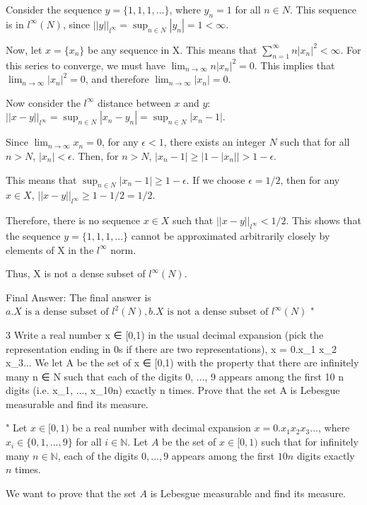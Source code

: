 Consider the sequence $y = \{1, 1, 1, ...\}$, where $y_n = 1$ for all $n \in N$. This sequence is in $l^{\infty}(N)$, since $||y||_{l^{\infty}} = \sup_{n \in N} |y_n| = 1 < \infty$.

Now, let $x = \{x_n\}$ be any sequence in X. This means that $\sum_{n=1}^{\infty} n |x_n|^2 < \infty$. For this series to converge, we must have $\lim_{n \to \infty} n |x_n|^2 = 0$. This implies that $\lim_{n \to \infty} |x_n|^2 = 0$, and therefore $\lim_{n \to \infty} |x_n| = 0$.

Now consider the $l^{\infty}$ distance between $x$ and $y$:
$||x - y||_{l^{\infty}} = \sup_{n \in N} |x_n - y_n| = \sup_{n \in N} |x_n - 1|$.

Since $\lim_{n \to \infty} x_n = 0$, for any $\epsilon < 1$, there exists an integer $N$ such that for all $n > N$, $|x_n| < \epsilon$.
Then, for $n > N$, $|x_n - 1| \ge |1 - |x_n|| > 1 - \epsilon$.

This means that $\sup_{n \in N} |x_n - 1| \ge 1 - \epsilon$.
If we choose $\epsilon = 1/2$, then for any $x \in X$, $||x - y||_{l^{\infty}} \ge 1 - 1/2 = 1/2$.

Therefore, there is no sequence $x \in X$ such that $||x - y||_{l^{\infty}} < 1/2$. This shows that the sequence $y = \{1, 1, 1, ...\}$ cannot be approximated arbitrarily closely by elements of X in the $l^{\infty}$ norm.

Thus, X is not a dense subset of $l^{\infty}(N)$.

Final Answer: The final answer is $\boxed{a. X \text{ is a dense subset of } l^2(N), b. X \text{ is not a dense subset of } l^{\infty}(N)}$
"

3 Write a real number x ∈ [0,1) in the usual decimal expansion (pick the representation ending in 0s if there are two representations), x = 0.x_1 x_2 x_3... We let A be the set of x ∈ [0,1) with the property that there are infinitely many n ∈ N such that each of the digits 0, ..., 9 appears among the first 10 n digits (i.e. x_1, ..., x_{10n}) exactly n times. Prove that the set A is Lebesgue measurable and find its measure.

"
Let $x \in [0,1)$ be a real number with decimal expansion $x = 0.x_1 x_2 x_3...$, where $x_i \in \{0, 1, ..., 9\}$ for all $i \in \mathbb{N}$.
Let $A$ be the set of $x \in [0,1)$ such that for infinitely many $n \in \mathbb{N}$, each of the digits $0, ..., 9$ appears among the first $10n$ digits exactly $n$ times.

We want to prove that the set $A$ is Lebesgue measurable and find its measure.


